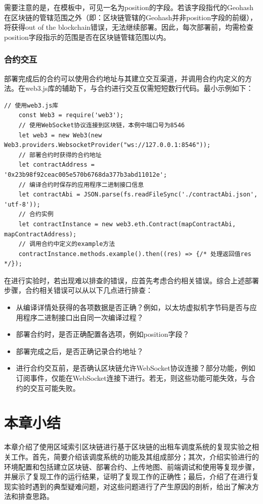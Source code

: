 需要注意的是，在模板中，可见一名为position的字段。若该字段指代的Geohash在区块链的管辖范围之外（即：区块链管辖的Geohash并非position字段的前缀），将获得out of the blockchain错误，无法继续部署。因此，每次部署前，均需检查position字段指示的范围是否在区块链管辖范围以内。

\subsubsection{合约交互}

部署完成后的合约可以使用合约地址与其建立交互渠道，并调用合约内定义的方法。在web3.js库的辅助下，与合约进行交互仅需短短数行代码。最小示例如下：

\begin{lstlisting}[caption={合约交互}, label={lst:合约交互}, morekeywords={let, const, new}]
    // 使用web3.js库
    const Web3 = require('web3');
    // 使用WebSocket协议连接到区块链，本例中端口号为8546
    let web3 = new Web3(new Web3.providers.WebsocketProvider("ws://127.0.0.1:8546"));
    // 部署合约时获得的合约地址
    let contractAddress = '0x23b98f92ceac005e570b6768da377b3abd11012e';
    // 编译合约时保存的应用程序二进制接口信息
    let contractAbi = JSON.parse(fs.readFileSync('./contractAbi.json', 'utf-8'));
    // 合约实例
    let contractInstance = new web3.eth.Contract(mapContractAbi, mapContractAddress);
    // 调用合约中定义的example方法
    contractInstance.methods.example().then((res) => {/* 处理返回值res */});
\end{lstlisting}

在进行实验时，若出现难以排查的错误，应首先考虑合约相关错误。综合上述部署步骤，合约相关错误可以从以下几点进行排查：

\begin{itemize}
    \item 从编译详情处获得的各项数据是否正确？例如，以太坊虚拟机字节码是否与应用程序二进制接口出自同一次编译过程？
    \item 部署合约时，是否正确配置各选项，例如position字段？
    \item 部署完成之后，是否正确记录合约地址？
    \item 进行合约交互前，是否确认区块链允许WebSocket协议连接？部分功能，例如订阅事件，仅能在WebSocket连接下进行。若无，则这些功能可能失效，与合约的交互可能失败。
\end{itemize}

\section{本章小结}

本章介绍了使用区域索引区块链进行基于区块链的出租车调度系统的复现实验之相关工作。首先，简要介绍该调度系统的功能及其组成部分；其次，介绍实验进行的环境配置和包括建立区块链、部署合约、上传地图、前端调试和使用等复现步骤，并展示了复现工作的运行结果，证明了复现工作的正确性；最后，介绍了在进行复现实验时遇到的典型疑难问题，对这些问题进行了产生原因的剖析，给出了解决方法和排查思路。
